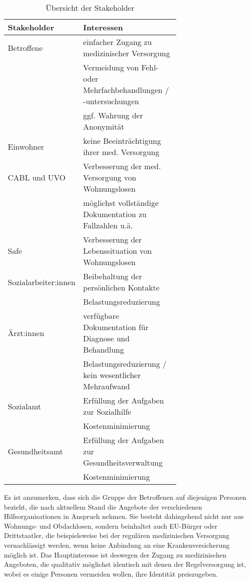 \begin{table}[ht]
	\centering
	\begin{tabulary}{\textwidth}{Lp{0.7\linewidth}}
		\toprule
		Stakeholder&				Interessen\\
		\midrule
		Betroffene&					einfacher Zugang zu medizinischer Versorgung\\
		&							Vermeidung von Fehl- oder Mehrfachbehandlungen / -untersuchungen\\
		&							ggf. Wahrung der Anonymität\\
		Einwohner&					keine Beeinträchtigung ihrer med. Versorgung\\
		CABL und UVO&				Verbesserung der med. Versorgung von Wohnungslosen\\
		&							möglichst vollständige Dokumentation zu Fallzahlen u.ä.\\
		Safe&						Verbesserung der Lebenssituation von Wohnungslosen\\
		Sozialarbeiter:innen&		Beibehaltung der persönlichen Kontakte\\
		&							Belastungsreduzierung\\
		Ärzt:innen&					verfügbare Dokumentation für Diagnose und Behandlung\\
		&							Belastungsreduzierung / kein wesentlicher Mehraufwand\\
		Sozialamt&					Erfüllung der Aufgaben zur Sozialhilfe\\
		&							Kostenminimierung\\
		Gesundheitsamt&				Erfüllung der Aufgaben zur Gesundheitsverwaltung\\
		&							Kostenminimierung\\
		\bottomrule
	\end{tabulary}
	\caption[Stakeholder]{Übersicht der Stakeholder}
	\label{tab:stakeholder}
\end{table}

Es ist anzumerken, dass sich die Gruppe der Betroffenen auf diejenigen Personen bezieht, die nach aktuellem Stand die Angebote der verschiedenen Hilfsorganisationen in Anspruch nehmen. Sie besteht dahingehend nicht nur aus Wohnungs- und Obdachlosen, sondern beinhaltet auch EU-Bürger oder Drittstaatler, die beispielsweise bei der regulären medizinischen Versorgung vernachlässigt werden, wenn keine Anbindung an eine Krankenversicherung möglich ist. Das Hauptinteresse ist deswegen der Zugang zu medizinischen Angeboten, die qualitativ möglichst identisch mit denen der Regelversorgung ist, wobei es einige Personen vermeiden wollen, ihre Identität preiszugeben.

